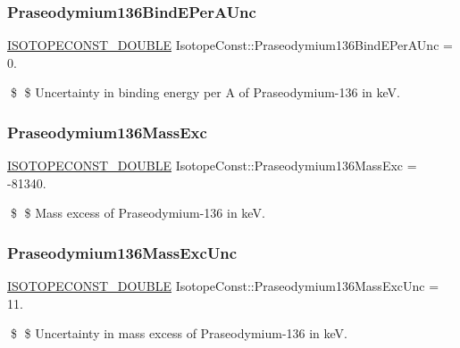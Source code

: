\subsubsection{\texorpdfstring{Praseodymium136\+Bind\+E\+Per\+A\+Unc}{Praseodymium136BindEPerAUnc}}
{\footnotesize\ttfamily \mbox{\hyperlink{group___isotope_const-_macros_ga8f45a7272ce02c0b4c65c44636ed719a}{I\+S\+O\+T\+O\+P\+E\+C\+O\+N\+S\+T\+\_\+\+D\+O\+U\+B\+LE}} Isotope\+Const\+::\+Praseodymium136\+Bind\+E\+Per\+A\+Unc = 0.}

\$ \$ Uncertainty in binding energy per A of Praseodymium-\/136 in keV. \mbox{\label{group___isotope_const-_praseodymium-_pr136_ga18effc1c3876ca80714a34faef248aad}} 
\subsubsection{\texorpdfstring{Praseodymium136\+Mass\+Exc}{Praseodymium136MassExc}}
{\footnotesize\ttfamily \mbox{\hyperlink{group___isotope_const-_macros_ga8f45a7272ce02c0b4c65c44636ed719a}{I\+S\+O\+T\+O\+P\+E\+C\+O\+N\+S\+T\+\_\+\+D\+O\+U\+B\+LE}} Isotope\+Const\+::\+Praseodymium136\+Mass\+Exc = -\/81340.}

\$ \$ Mass excess of Praseodymium-\/136 in keV. \mbox{\label{group___isotope_const-_praseodymium-_pr136_gaf9e443998427f3defad36c28fc268503}} 
\subsubsection{\texorpdfstring{Praseodymium136\+Mass\+Exc\+Unc}{Praseodymium136MassExcUnc}}
{\footnotesize\ttfamily \mbox{\hyperlink{group___isotope_const-_macros_ga8f45a7272ce02c0b4c65c44636ed719a}{I\+S\+O\+T\+O\+P\+E\+C\+O\+N\+S\+T\+\_\+\+D\+O\+U\+B\+LE}} Isotope\+Const\+::\+Praseodymium136\+Mass\+Exc\+Unc = 11.}

\$ \$ Uncertainty in mass excess of Praseodymium-\/136 in keV. \mbox{\label{group___isotope_const-_praseodymium-_pr136_ga32acbe3f5e021b50fda982e71c412209}} 
